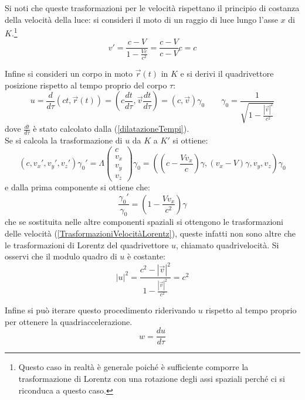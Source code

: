 Si noti che queste trasformazioni per le velocità rispettano il principio di costanza della velocità della luce: si consideri il moto di un raggio di luce lungo l'asse $x$ di $K$.\footnote{Questo caso in realtà è generale poiché è sufficiente comporre la trasformazione di Lorentz con una rotazione degli assi spaziali perché ci si riconduca a questo caso.} 
\begin{equation*}
    v'=\frac{c-V}{1-\frac{Vc}{c^2}}=\frac{c-V}{c-V}c=c
\end{equation*}

Infine si consideri un corpo in moto $\vec r(t)$ in $K$ e si derivi il quadrivettore posizione rispetto al tempo proprio del corpo $\tau$:
\begin{equation}
    u=\frac{d }{d\tau}(ct,\vec r(t))=(c\frac{dt}{d\tau},\vec v\frac{dt}{d\tau})=(c,\vec v)\gamma_0 \qquad \gamma_0=\frac{1}{\sqrt{1-\frac{|\vec v|^2}{c^2}}}
    \label{defQuadrivelocità}
\end{equation}
dove $\frac{dt}{d\tau}$ è stato calcolato dalla (\ref{dilatazioneTempi}).\\
Se si calcola la trasformazione di $u$ da $K$ a $K'$ si ottiene:
\begin{equation*}
       (c,  v_x',  v_y', v_z')\gamma_0'=\Lambda    
    \begin{pmatrix}
        c \\ v_x \\ v_y \\ v_z
     \end{pmatrix}\gamma_0=((c-\frac{Vv_x}{c})\gamma, (v_x-V)\gamma, v_y,  v_z)\gamma_0
\end{equation*}
e dalla prima componente si ottiene che:
\begin{equation}
    \frac{\gamma_0'}{\gamma_0}=(1-\frac{Vv_x}{c^2})\gamma
\end{equation}
che se sostituita nelle altre componenti spaziali si ottengono le trasformazioni delle velocità (\ref{TrasformazioniVelocitàLorentz}), queste infatti non sono altre che le trasformazioni di Lorentz del quadrivettore $u$, chiamato quadrivelocità. Si osservi che il modulo quadro di $u$ è costante:
\begin{equation*}
    |u|^2=\frac{c^2-|\vec v|^2}{1-\frac{|\vec v|^2}{c^2}}=c^2
\end{equation*} 

Infine si può iterare questo procedimento riderivando $u$ rispetto al tempo proprio per ottenere la quadriaccelerazione.
\begin{equation}
    w=\frac{du}{d\tau}
\end{equation}
